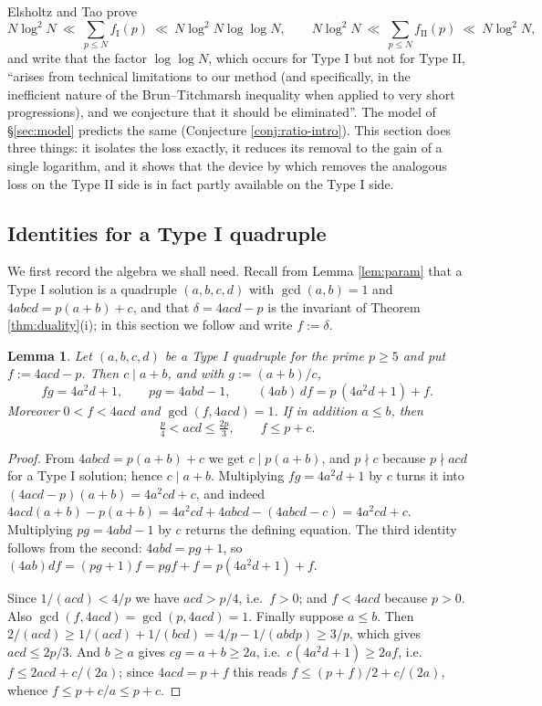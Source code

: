 \documentclass[11pt,reqno]{amsart}
\theoremstyle{plain}
\newtheorem{lemma}[theorem]{Lemma}
\theoremstyle{definition}
\numberwithin{equation}{section}
\newcommand{\fI}{f_{\mathrm{I}}}
\newcommand{\fII}{f_{\mathrm{II}}}
\begin{document}
Elsholtz and Tao \cite{ElsholtzTao} prove
\begin{equation}\label{eq:etbounds}
  N\log^{2}N\ \ll\ \sum_{p\le N}\fI(p)\ \ll\ N\log^{2}N\log\log N,
  \qquad
  N\log^{2}N\ \ll\ \sum_{p\le N}\fII(p)\ \ll\ N\log^{2}N,
\end{equation}
and write that the factor $\log\log N$, which occurs for Type I but not for Type II,
``arises from technical limitations to our method (and specifically, in the
inefficient nature of the Brun--Titchmarsh inequality when applied to very short
progressions), and we conjecture that it should be eliminated''. The model of
\S\ref{sec:model} predicts the same (Conjecture \ref{conj:ratio-intro}). This section
does three things: it isolates the loss exactly, it reduces its removal to the gain of
a single logarithm, and it shows that the device by which \cite{ElsholtzTao} removes
the analogous loss on the Type II side is in fact partly available on the Type I side.

\subsection{Identities for a Type I quadruple}
We first record the algebra we shall need. Recall from Lemma \ref{lem:param} that a
Type I solution is a quadruple $(a,b,c,d)$ with $\gcd(a,b)=1$ and $4abcd=p(a+b)+c$,
and that $\delta=4acd-p$ is the invariant of Theorem \ref{thm:duality}(i); in this
section we follow \cite{ElsholtzTao} and write $f:=\delta$.

\begin{lemma}\label{lem:idents}
Let $(a,b,c,d)$ be a Type I quadruple for the prime $p\ge5$ and put $f:=4acd-p$. Then
$c\mid a+b$, and with $g:=(a+b)/c$,
\begin{equation}\label{eq:fg}
  fg=4a^{2}d+1,\qquad pg=4abd-1,\qquad (4ab)\,df=p\,(4a^{2}d+1)+f .
\end{equation}
Moreover $0<f<4acd$ and $\gcd(f,4acd)=1$. If in addition $a\le b$, then
\begin{equation}\label{eq:acdrange}
  \tfrac p4<acd\le\tfrac{2p}3,\qquad f\le p+c .
\end{equation}
\end{lemma}

\begin{proof}
From $4abcd=p(a+b)+c$ we get $c\mid p(a+b)$, and $p\nmid c$ because $p\nmid acd$ for a
Type I solution; hence $c\mid a+b$. Multiplying $fg=4a^{2}d+1$ by $c$ turns it into
$(4acd-p)(a+b)=4a^{2}cd+c$, and indeed
$4acd(a+b)-p(a+b)=4a^{2}cd+4abcd-(4abcd-c)=4a^{2}cd+c$. Multiplying $pg=4abd-1$ by $c$
returns the defining equation. The third identity follows from the second: $4abd=pg+1$,
so $(4ab)df=(pg+1)f=pgf+f=p(4a^{2}d+1)+f$.

Since $1/(acd)<4/p$ we have $acd>p/4$, i.e.\ $f>0$; and $f<4acd$ because $p>0$. Also
$\gcd(f,4acd)=\gcd(p,4acd)=1$. Finally suppose $a\le b$. Then
$2/(acd)\ge1/(acd)+1/(bcd)=4/p-1/(abdp)\ge3/p$, which gives $acd\le2p/3$. And $b\ge a$
gives $cg=a+b\ge2a$, i.e.\ $c(4a^{2}d+1)\ge2af$, i.e.\ $f\le2acd+c/(2a)$; since
$4acd=p+f$ this reads $f\le(p+f)/2+c/(2a)$, whence $f\le p+c/a\le p+c$.
\end{proof}
\end{document}
